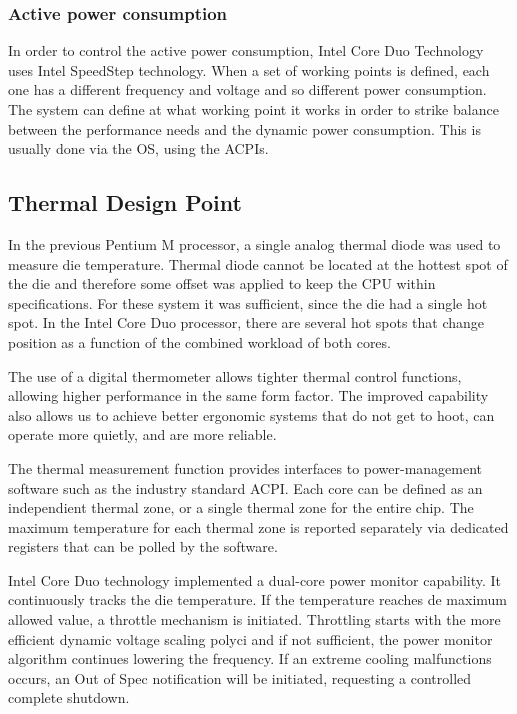 \subsubsection{Active power consumption}
In order to control the active power consumption, Intel Core Duo Technology uses Intel SpeedStep technology. When a set of working points is defined, each one has a different frequency and voltage and so different power consumption. The system can define at what working point it works in order to strike balance between the performance needs and the dynamic power consumption. This is usually done via the OS, using the ACPIs.

\subsection{Thermal Design Point}
In the previous Pentium M processor, a single analog thermal diode was used to measure die temperature. Thermal diode cannot be located at the hottest spot of the die and therefore some offset was applied to keep the CPU within specifications. For these system it was sufficient, since the die had a single hot spot. In the Intel Core Duo processor, there are several hot spots that change position as a function of the combined workload of both cores.

The use of a digital thermometer allows tighter thermal control functions, allowing higher performance in the same form factor. The improved capability also allows us to achieve better ergonomic systems that do not get to hoot, can operate more quietly, and are more reliable.

The thermal measurement function provides interfaces to power-management software such as the industry standard ACPI. Each core can be defined as an independient thermal zone, or a single thermal zone for the entire chip. The maximum temperature for each thermal zone is reported separately via dedicated registers that can be polled by the software.

Intel Core Duo technology implemented a dual-core power monitor capability. It continuously tracks the die temperature. If the temperature reaches de maximum allowed value, a throttle mechanism is initiated. Throttling starts with the more efficient dynamic voltage scaling polyci and if not sufficient, the power monitor algorithm continues lowering the frequency. If an extreme cooling malfunctions occurs, an Out of Spec notification will be initiated, requesting a controlled complete shutdown.

